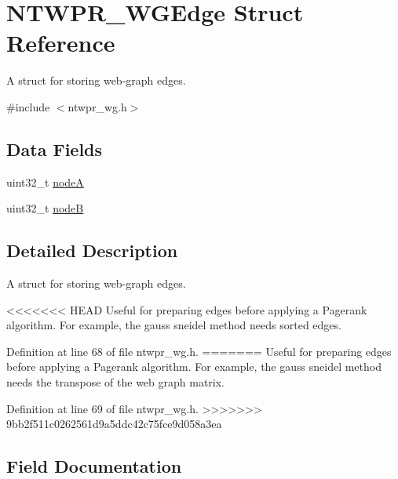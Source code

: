 \hypertarget{structNTWPR__WGEdge}{}\section{N\+T\+W\+P\+R\+\_\+\+W\+G\+Edge Struct Reference}
\label{structNTWPR__WGEdge}


A struct for storing web-\/graph edges.  




{\ttfamily \#include $<$ntwpr\+\_\+wg.\+h$>$}

\subsection*{Data Fields}
\begin{DoxyCompactItemize}
\item 
uint32\+\_\+t \mbox{\hyperlink{structNTWPR__WGEdge_a817882eb86490ad61dd36c6ed7ac47f8}{nodeA}}
\item 
uint32\+\_\+t \mbox{\hyperlink{structNTWPR__WGEdge_a0f9b43039574824cc76908125ad3661d}{nodeB}}
\end{DoxyCompactItemize}


\subsection{Detailed Description}
A struct for storing web-\/graph edges. 

<<<<<<< HEAD
Useful for preparing edges before applying a Pagerank algorithm. For example, the gauss sneidel method needs sorted edges. 

Definition at line 68 of file ntwpr\+\_\+wg.\+h.
=======
Useful for preparing edges before applying a Pagerank algorithm. For example, the gauss sneidel method needs the transpose of the web graph matrix. 

Definition at line 69 of file ntwpr\+\_\+wg.\+h.
>>>>>>> 9bb2f511c0262561d9a5ddc42c75fce9d058a3ea



\subsection{Field Documentation}
\mbox{\label{structNTWPR__WGEdge_a817882eb86490ad61dd36c6ed7ac47f8}} 
